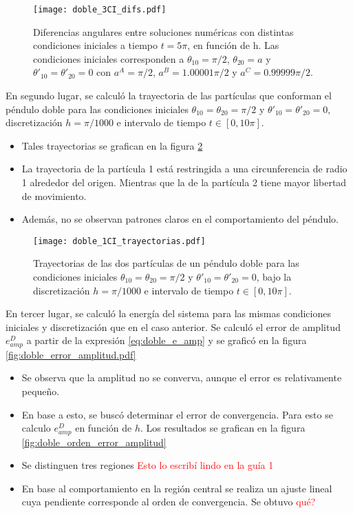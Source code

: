\documentclass[aps,prb,twocolumn,superscriptaddress,floatfix,longbibliography]{revtex4-2}
\newcounter{para}
\begin{document}
\begin{figure}[h]
  \texttt{[image: doble\_3CI\_difs.pdf]}
  \caption{Diferencias angulares entre soluciones numéricas con distintas condiciones iniciales a tiempo $t = 5 \pi$, en función de h. Las condiciones iniciales corresponden a $\theta_{1 0} = \pi/2$, $\theta_{2 0} = a$ y $\theta'_{1 0} = \theta'_{2 0} = 0$ con $a^A = \pi/2$, $a^B = 1.00001 \pi/2$ y $a^C = 0.99999 \pi/2$.}
   \label{fig:doble_3CI_difs}
\end{figure}

En segundo lugar, se calculó la trayectoria de las partículas que conforman el péndulo doble para las condiciones iniciales $\theta_{1 0} = \theta_{2 0} = \pi/2$ y $\theta'_{1 0} = \theta'_{2 0} = 0$, discretización $h = \pi/1000$ e intervalo de tiempo $t \in [0, 10 \pi]$.
\begin{itemize}
  \item Tales trayectorias se grafican en la figura \ref{fig:doble_1CI_trayectorias}
  \item La trayectoria de la partícula 1 está restringida a una circunferencia de radio 1 alrededor del origen. Mientras que la de la partícula 2 tiene mayor libertad de movimiento.
  \item Además, no se observan patrones claros en el comportamiento del péndulo.
\end{itemize}


\begin{figure}[h]
  \texttt{[image: doble\_1CI\_trayectorias.pdf]}
  \caption{Trayectorias de las dos partículas de un péndulo doble para las condiciones iniciales  $\theta_{1 0} = \theta_{2 0} = \pi/2$ y $\theta'_{1 0} = \theta'_{2 0} = 0$, bajo la discretización $h = \pi/1000$ e intervalo de tiempo $t \in [0, 10 \pi]$.}
   \label{fig:doble_1CI_trayectorias}
\end{figure}


En tercer lugar, se calculó la energía del sistema para las mismas condiciones iniciales y discretización que en el caso anterior. Se calculó el error de amplitud $e_{amp}^D$ a partir de la expresión \ref{eq:doble_e_amp} y se graficó en la figura \ref{fig:doble_error_amplitud.pdf}

\begin{itemize}
  \item Se observa que la amplitud no se converva, aunque el error es relativamente pequeño.
  \item En base a esto, se buscó determinar el error de convergencia. Para esto se calculo $e_{amp}^D$ en función de $h$. Los resultados se grafican en la figura \ref{fig:doble_orden_error_amplitud}
  \item Se distinguen tres regiones \textcolor{red}{Esto lo escribí lindo en la guía 1}
  \item En base al comportamiento en la región central se realiza un ajuste lineal cuya pendiente corresponde al orden de convergencia. Se obtuvo \textcolor{red}{qué?}
\end{itemize}
\end{document}
